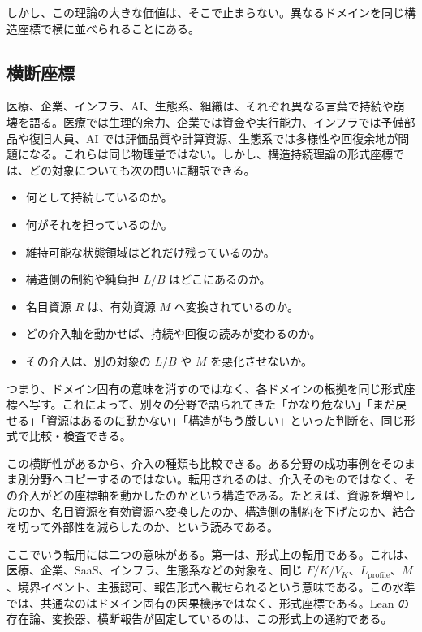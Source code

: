\documentclass[12pt,a4paper]{article}
\begin{document}
しかし、この理論の大きな価値は、そこで止まらない。異なるドメインを同じ構造座標で横に並べられることにある。

\subsection{横断座標}\label{ux6a2aux65adux5ea7ux6a19}

医療、企業、インフラ、AI、生態系、組織は、それぞれ異なる言葉で持続や崩壊を語る。医療では生理的余力、企業では資金や実行能力、インフラでは予備部品や復旧人員、AI では評価品質や計算資源、生態系では多様性や回復余地が問題になる。これらは同じ物理量ではない。しかし、構造持続理論の形式座標では、どの対象についても次の問いに翻訳できる。

\begin{itemize}
\tightlist
\item
  何として持続しているのか。
\item
  何がそれを担っているのか。
\item
  維持可能な状態領域はどれだけ残っているのか。
\item
  構造側の制約や純負担 \(L/B\) はどこにあるのか。
\item
  名目資源 \(R\) は、有効資源 \(M\) へ変換されているのか。
\item
  どの介入軸を動かせば、持続や回復の読みが変わるのか。
\item
  その介入は、別の対象の \(L/B\) や \(M\) を悪化させないか。
\end{itemize}

つまり、ドメイン固有の意味を消すのではなく、各ドメインの根拠を同じ形式座標へ写す。これによって、別々の分野で語られてきた「かなり危ない」「まだ戻せる」「資源はあるのに動かない」「構造がもう厳しい」といった判断を、同じ形式で比較・検査できる。

この横断性があるから、介入の種類も比較できる。ある分野の成功事例をそのまま別分野へコピーするのではない。転用されるのは、介入そのものではなく、その介入がどの座標軸を動かしたのかという構造である。たとえば、資源を増やしたのか、名目資源を有効資源へ変換したのか、構造側の制約を下げたのか、結合を切って外部性を減らしたのか、という読みである。

ここでいう転用には二つの意味がある。第一は、形式上の転用である。これは、医療、企業、SaaS、インフラ、生態系などの対象を、同じ \(F/K/V_K\)、\(L_{\mathrm{profile}}\)、\(M\)、境界イベント、主張認可、報告形式へ載せられるという意味である。この水準では、共通なのはドメイン固有の因果機序ではなく、形式座標である。Lean の存在論、変換器、横断報告が固定しているのは、この形式上の通約である。
\end{document}
